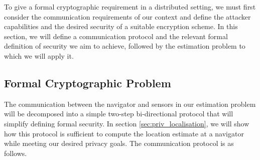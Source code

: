 \documentclass[10pt,letterpaper,oneside,twocolumn,journal]{IEEEtran}
\theoremstyle{definition}
\theoremstyle{definition}
\theoremstyle{remark}
\begin{document}
To give a formal cryptographic requirement in a distributed setting, we must first consider the communication requirements of our context and define the attacker capabilities and the desired security of a suitable encryption scheme. In this section, we will define a communication protocol and the relevant formal definition of security we aim to achieve, followed by the estimation problem to which we will apply it.

% 
% 

\subsection{Formal Cryptographic Problem} \label{subsec:crypto_problem}
The communication between the navigator and sensors in our estimation problem will be decomposed into a simple two-step bi-directional protocol that will simplify defining formal security. In section \ref{sec:priv_localisation}, we will show how this protocol is sufficient to compute the location estimate at a navigator while meeting our desired privacy goals. The communication protocol is as follows.
\end{document}

